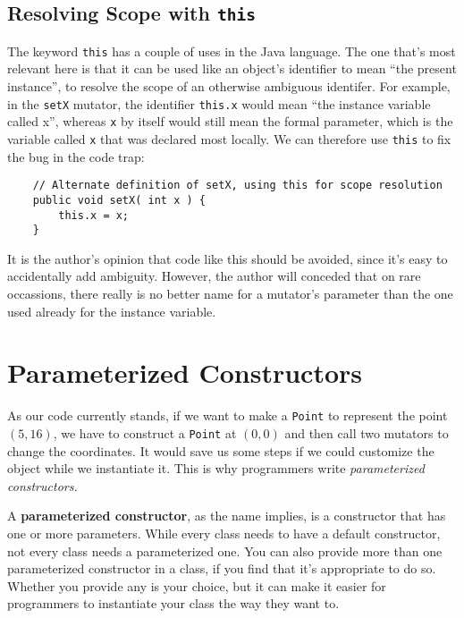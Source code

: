 \subsection{Resolving Scope with \texttt{this}}

The keyword \texttt{this} has a couple of uses in the Java language.  The one that's most relevant here is that it can be used like an object's identifier to mean ``the present instance'', to resolve the scope of an otherwise ambiguous identifer.  For example, in the \texttt{setX} mutator, the identifier \texttt{this.x} would mean ``the instance variable called x'', whereas \texttt{x} by itself would still mean the formal parameter, which is the variable called \texttt{x} that was declared most locally.  We can therefore use \texttt{this} to fix the bug in the code trap:

\begin{verbatim}
    // Alternate definition of setX, using this for scope resolution
    public void setX( int x ) {
        this.x = x;
    }
\end{verbatim}

It is the author's opinion that code like this should be avoided, since it's easy to accidentally add ambiguity.  However, the author will conceded that on rare occassions, there really is no better name for a mutator's parameter than the one used already for the instance variable.

\section{Parameterized Constructors}

As our code currently stands, if we want to make a \texttt{Point} to represent the point $(5, 16)$, we have to construct a \texttt{Point} at $(0,0)$ and then call two mutators to change the coordinates.  It would save us some steps if we could customize the object while we instantiate it.  This is why programmers write \textit{parameterized constructors.}

A \textbf{parameterized constructor}, as the name implies, is a constructor that has one or more parameters.  While every class needs to have a default constructor, not every class needs a parameterized one.  You can also provide more than one parameterized constructor in a class, if you find that it's appropriate to do so.  Whether you provide any is your choice, but it can make it easier for programmers to instantiate your class the way they want to.

